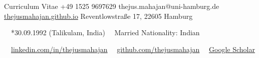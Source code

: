 \documentclass{thejus_cv}
\begin{document}
         {Curriculum Vitae}
         {+49 1525 9697629}
         {thejus.mahajan@uni-hamburg.de}
         {\href{https://thejusmahajan.github.io}{thejusmahajan.github.io}}
         {Reventlowstra{\ss}e 17, 22605 Hamburg}

\vspace{-0.5cm}
{\small\color{white}
\faCalendar\ \ *30.09.1992 (Talikulam, India) \hspace{0.5cm} \faUser\ \ Married \hspace{0.5cm} Nationality: Indian
}\par
\vspace{0.1cm}
{\small\color{white}
\faLinkedin\ \ \href{https://www.linkedin.com/in/thejusmahajan/}{linkedin.com/in/thejusmahajan}
\hspace{0.5cm}
\faGithub\ \ \href{https://github.com/thejusmahajan}{github.com/thejusmahajan}
\hspace{0.5cm}
\faGraduationCap\ \ \href{https://scholar.google.com/citations?user=PJkZwAwAAAAJ}{Google Scholar}
}\par
\vspace{0.1cm}
\end{document}
